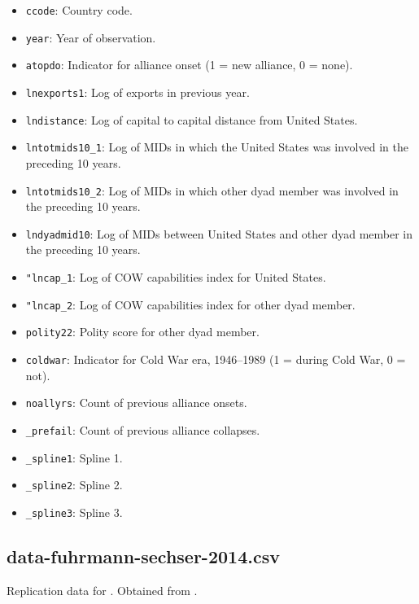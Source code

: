\documentclass[12pt]{article}
\begin{document}
\begin{itemize}
  \item \texttt{ccode}: Country code.
  \item \texttt{year}: Year of observation.
  \item \texttt{atopdo}: Indicator for alliance onset (1 = new alliance, 0 = none).
  \item \texttt{lnexports1}: Log of exports in previous year.
  \item \texttt{lndistance}: Log of capital to capital distance from United States.
  \item \texttt{lntotmids10\_1}:  Log of MIDs in which the United States was involved in the preceding 10 years.
  \item \texttt{lntotmids10\_2}: Log of MIDs in which other dyad member was involved in the preceding 10 years.
  \item \texttt{lndyadmid10}: Log of MIDs between United States and other dyad member in the preceding 10 years.
  \item \texttt{"lncap\_1}: Log of COW capabilities index for United States.
  \item \texttt{"lncap\_2}: Log of COW capabilities index for other dyad member.
  \item \texttt{polity22}: Polity score for other dyad member.
  \item \texttt{coldwar}: Indicator for Cold War era, 1946--1989 (1 = during Cold War, 0 = not).
  \item \texttt{noallyrs}: Count of previous alliance onsets.
  \item \texttt{\_prefail}: Count of previous alliance collapses.
  \item \texttt{\_spline1}: Spline 1.
  \item \texttt{\_spline2}: Spline 2.
  \item \texttt{\_spline3}: Spline 3.
\end{itemize}

\subsection{data-fuhrmann-sechser-2014.csv}

Replication data for \citet{Fuhrmann:2014kd}.
Obtained from \citet{fuhrmann2014data}.
\end{document}
